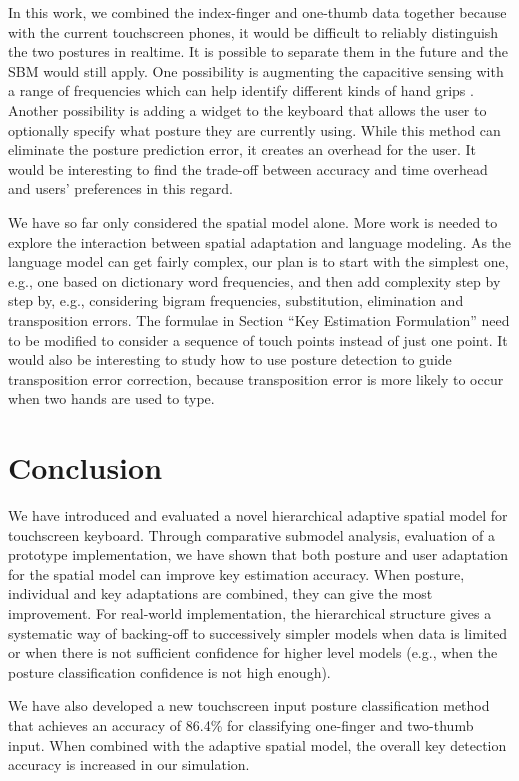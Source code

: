 \documentclass{sigchi}
\begin{document}
In this work, we combined the index-finger and one-thumb data together because 
with the current touchscreen phones, it would be difficult to reliably 
distinguish the two postures in realtime. It is possible to separate them in the
future and the SBM would still apply. One possibility is augmenting the
capacitive sensing with a range of frequencies which can help identify different kinds of 
hand grips \cite{Sato:2012}. Another possibility is adding a widget to the
keyboard that allows the user to optionally specify what posture they are
currently using. While this method can eliminate the posture
prediction error, it creates an overhead for the user. It would be interesting
to find the trade-off between accuracy and time overhead
and users' preferences in this regard.

We have so far only considered the spatial model alone. More work is needed
to explore the interaction between spatial adaptation and language modeling.
As the language model can get fairly complex, our plan is to start with the
simplest one, e.g., one based on dictionary word frequencies, and then add
complexity step by step by, e.g., considering bigram frequencies, substitution,
elimination and transposition errors.
The formulae in Section ``Key Estimation Formulation'' need to be modified to consider a
sequence of touch points \cite{Goodman:2002, Gunawardana:2010} instead of just one point.
It would also be interesting to study how to use posture detection to guide 
transposition error correction, because transposition error is more likely to 
occur when two hands are used to type.

\section{Conclusion}
We have introduced and evaluated a novel hierarchical adaptive spatial model for
touchscreen keyboard. Through comparative submodel analysis, evaluation of a prototype implementation, we have shown that both posture and user adaptation for the spatial model can improve key estimation accuracy. When posture, individual and key adaptations are combined, they can
give the most improvement. For real-world
implementation, the
hierarchical structure gives a systematic way of backing-off to successively simpler models  when data is limited
or when there is not sufficient confidence for higher level models (e.g., when the posture classification confidence is not 
high enough).

We have also developed a new touchscreen input posture classification method
that achieves an accuracy of 86.4\% for classifying one-finger and two-thumb input. When
combined with the adaptive spatial model, the overall key detection accuracy is increased
in our simulation.
\end{document}
